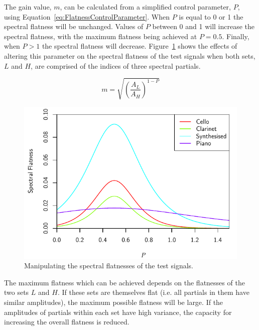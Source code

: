 		The gain value, $m$, can be calculated from a simplified control parameter, $P$, using
		Equation~\ref{eq:FlatnessControlParameter}. When $P$ is equal to 0 or 1 the spectral flatness will be
		unchanged.  Values of $P$ between 0 and 1 will increase the spectral flatness, with the maximum flatness
		being achieved at $P = 0.5$. Finally, when $P > 1$ the spectral flatness will decrease.
		Figure~\ref{fig:MoveFlatnesses} shows the effects of altering this parameter on the spectral flatness of
		the test signals when both sets, $L$ and $H$, are comprised of the indices of three spectral partials.

		\begin{equation}
			m = \sqrt{ \left( \frac{A_L}{A_H} \right) ^{1 - P}}
			\label{eq:FlatnessControlParameter}
		\end{equation}

		\begin{figure}[h!]
			\centering
			\includegraphics{chapter6/Images/MoveFlatnesses.pdf}
			\caption{Manipulating the spectral flatnesses of the test signals.}
			\label{fig:MoveFlatnesses}
		\end{figure}

		The maximum flatness which can be achieved depends on the flatnesses of the two sets $L$ and $H$.  If these
		sets are themselves flat (i.e. all partials in them have similar amplitudes), the maximum possible flatness
		will be large. If the amplitudes of partials within each set have high variance, the capacity for
		increasing the overall flatness is reduced.

